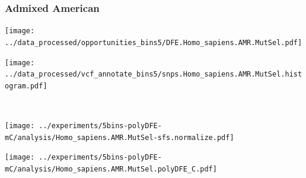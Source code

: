 \subsubsection{Admixed American}

\begin{minipage}{0.49\linewidth}
    \texttt{[image: ../data\_processed/opportunities\_bins5/DFE.Homo\_sapiens.AMR.MutSel.pdf]}
\end{minipage}
\begin{minipage}{0.49\linewidth}
    \texttt{[image: ../data\_processed/vcf\_annotate\_bins5/snps.Homo\_sapiens.AMR.MutSel.histogram.pdf]}
\end{minipage}
\\
\begin{minipage}{0.49\linewidth}
    \texttt{[image: ../experiments/5bins-polyDFE-mC/analysis/Homo\_sapiens.AMR.MutSel-sfs.normalize.pdf]}
\end{minipage}
\begin{minipage}{0.4\linewidth}
    \texttt{[image: ../experiments/5bins-polyDFE-mC/analysis/Homo\_sapiens.AMR.MutSel.polyDFE\_C.pdf]}
\end{minipage}
